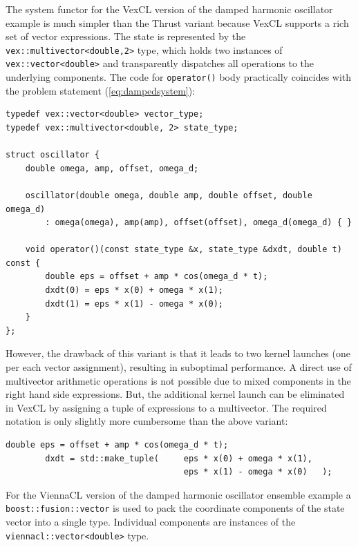 \documentclass[final]{siamltex}
\newcommand{\code}[1]{\lstinline|#1|}
\newcommand{\eqref}[1]{(\ref{#1})}
\begin{document}
The system functor for the VexCL version of the damped harmonic oscillator
example is much simpler than the Thrust variant because VexCL supports a rich
set of vector expressions. The state is represented by the
\code{vex::multivector<double,2>} type, which holds two instances of
\code{vex::vector<double>} and transparently dispatches all operations to the
underlying components. The code for \code{operator()} body practically
coincides with the problem statement \eqref{eq:dampedsystem}:
\begin{lstlisting}
typedef vex::vector<double> vector_type;
typedef vex::multivector<double, 2> state_type;

struct oscillator {
    double omega, amp, offset, omega_d;

    oscillator(double omega, double amp, double offset, double omega_d)
        : omega(omega), amp(amp), offset(offset), omega_d(omega_d) { }

    void operator()(const state_type &x, state_type &dxdt, double t) const {
        double eps = offset + amp * cos(omega_d * t);
        dxdt(0) = eps * x(0) + omega * x(1);
        dxdt(1) = eps * x(1) - omega * x(0);
    }
};
\end{lstlisting}


However, the drawback of this variant is that it leads
to two kernel launches (one per each vector assignment), resulting in
suboptimal performance. A direct use of multivector arithmetic
operations is not possible due to mixed components in the right hand side expressions.
But, the additional kernel launch can be eliminated in VexCL by assigning a tuple of expressions to a multivector.
The required notation is only slightly more cumbersome than the above variant:
\begin{lstlisting}[firstnumber=11]
        double eps = offset + amp * cos(omega_d * t);
        dxdt = std::make_tuple(     eps * x(0) + omega * x(1),
                                    eps * x(1) - omega * x(0)   );
\end{lstlisting}

For the ViennaCL version of the damped harmonic oscillator ensemble example a
\code{boost::fusion::vector} is used to pack the coordinate components of the state vector into a
single type. Individual components are instances of the
\code{viennacl::vector<double>} type.
\end{document}
